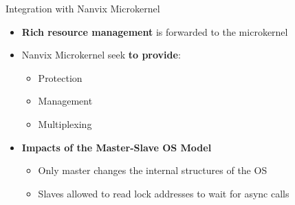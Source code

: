 		\begin{frame}[fragile]{Integration with Nanvix Microkernel}

			\begin{itemize}
				\item \textbf{Rich resource management} is forwarded to the microkernel
			\end{itemize}

			\begin{itemize}
				\item Nanvix Microkernel seek \textbf{to provide}:
				\begin{itemize}
					\item Protection
					\item Management
					\item Multiplexing
				\end{itemize}
			\end{itemize}

			\begin{itemize}
				\item \textbf{Impacts of the Master-Slave OS Model}
				\begin{itemize}
					\item Only master changes the internal structures of the OS
					\item Slaves allowed to read lock addresses to wait for async calls
				\end{itemize}
			\end{itemize}

		\end{frame}

			


